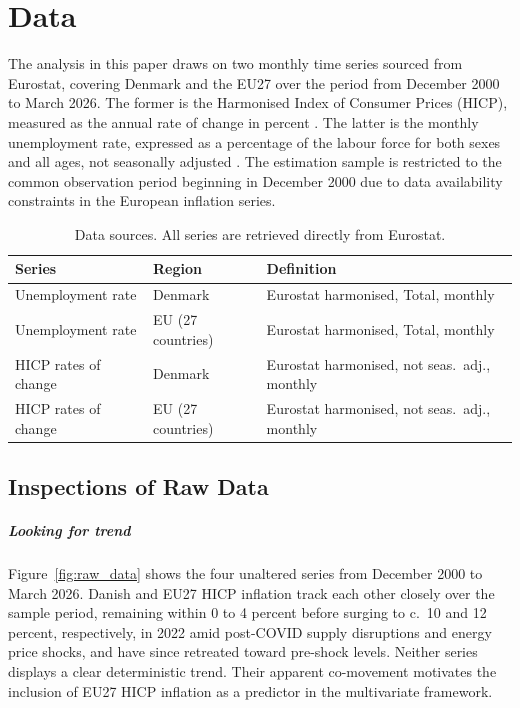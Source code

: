 \chapter{Data}\label{sec:data}
The analysis in this paper draws on two monthly time series sourced from Eurostat, covering Denmark and the EU27 over the period from December 2000 to March 2026. The former is the Harmonised Index of Consumer Prices (HICP), measured as the annual rate of change in percent \parencite{eurostat_hicp}. The latter is the monthly unemployment rate, expressed as a percentage of the labour force for both sexes and all ages, not seasonally adjusted \parencite{eurostat_unemployment}. The estimation sample is restricted to the common observation period beginning in December 2000 due to data availability constraints in the European inflation series. 
\begin{table}[h!]
\centering
\small{
\caption{Data sources. All series are retrieved directly from Eurostat.}
\begin{tabular*}{\textwidth}{@{\extracolsep{\fill}}lll}
\hline \hline
\rule{0pt}{12pt}\textbf{Series} & \textbf{Region} & \textbf{Definition} \\ [3pt]
\hline
\rule{0pt}{12pt}Unemployment rate & Denmark & Eurostat harmonised, Total, monthly \\ [3pt]
\rule{0pt}{12pt}Unemployment rate & EU (27 countries)  & Eurostat harmonised, Total, monthly \\ [3pt]
\rule{0pt}{12pt}HICP rates of change & Denmark  & Eurostat harmonised, not seas.\ adj., monthly \\ [3pt]
\rule{0pt}{12pt}HICP rates of change &  EU (27 countries)  & Eurostat harmonised, not seas.\ adj., monthly \\ [3pt]
\hline \hline
\end{tabular*}
}
\end{table}

\section{Inspections of Raw Data}
\paragraph{Looking for trend}
Figure~\ref{fig:raw_data} shows the four unaltered series from December 2000 to March 2026. Danish and EU27 HICP inflation track each other closely over the sample period, remaining within 0 to 4 percent before surging to c.\ 10 and 12 percent, respectively, in 2022 amid post-COVID supply disruptions and energy price shocks, and have since retreated toward pre-shock levels. Neither series displays a clear deterministic trend. Their apparent co-movement motivates the inclusion of EU27 HICP inflation as a predictor in the multivariate framework.

